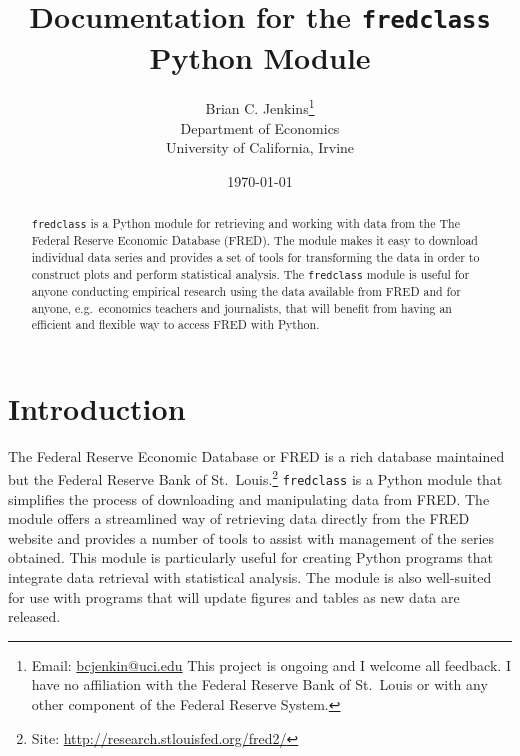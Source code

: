 \documentclass[11pt,fleqn]{article}
\newcommand{\ttt}{\texttt}
\begin{document}
\begin{titlepage}
\title{Documentation for the \ttt{fredclass} Python Module}
\author{Brian C. Jenkins\thanks{Email: \href{mailto:bcjenkin@uci.edu}{bcjenkin@uci.edu} This project is ongoing and I welcome all feedback. I have no affiliation with the Federal Reserve Bank of St.~Louis or with any other component of the Federal Reserve System.}\\Department of Economics \\University of California, Irvine}
\date{\today}

\maketitle

\begin{abstract}
\noindent \ttt{fredclass} is a Python module for retrieving and working with data from the The Federal Reserve Economic Database (FRED). The module makes it easy to download individual data series and provides a set of tools for transforming the data in order to construct plots and perform statistical analysis. The \ttt{fredclass} module is useful for anyone conducting empirical research using the data available from FRED and for anyone, e.g.~economics teachers and journalists, that will benefit from having an efficient and flexible way to access FRED with Python.
\end{abstract}

\thispagestyle{empty}
\end{titlepage}

\tableofcontents

\newpage

\section{Introduction}

The Federal Reserve Economic Database or FRED is a rich database maintained but the Federal Reserve Bank of St.~Louis.\footnote{Site: \href{http://research.stlouisfed.org/fred2/}{http://research.stlouisfed.org/fred2/}} \verb=fredclass= is a Python module that simplifies the process of downloading and manipulating data from FRED. The module offers a streamlined way of retrieving data directly from the FRED website and provides a number of tools to assist with management of the series obtained. This module is particularly useful for creating Python programs that integrate data retrieval with statistical analysis. The module is also well-suited for use with programs that will update figures and tables as new data are released.
\end{document}
